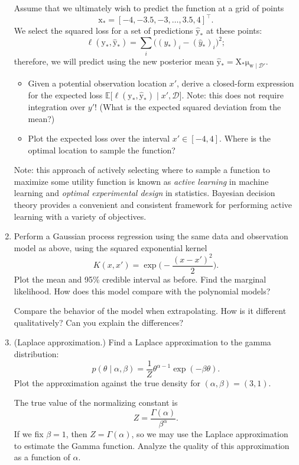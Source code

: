 \documentclass{article}
\newcommand{\given}{\mid}
\newcommand{\mc}[1]{\mathcal{#1}}
\newcommand{\data}{\mc{D}}
\newcommand{\mat}[1]{\bm{\mathrm{#1}}}
\renewcommand{\vec}[1]{\bm{\mathrm{#1}}}
\newcommand{\trans}{^\top}
\begin{document}
\begin{enumerate}
  Assume that we ultimately wish to predict the function at a grid of
  points
  \begin{equation*}
    \vec{x}_\ast = [-4, -3.5, -3, \dotsc, 3.5, 4]\trans.
  \end{equation*}
  We select the squared loss for a set of predictions
  $\hat{\vec{y}}_\ast$ at these points:
  \begin{equation*}
    \ell(\vec{y}_\ast, \hat{\vec{y}}_\ast)
    =
    \sum_i \bigl((y_\ast)_i - (\hat{y}_\ast)_i\bigr)^2;
  \end{equation*}
  therefore, we will predict using the new posterior mean
  $\hat{\vec{y}}_\ast = \mat{X}_\ast \vec{\mu}_{\vec{w}\given\data'}$.
  \begin{itemize}
  \item
    Given a potential observation location $x'$, derive a closed-form
    expression for the expected loss
    $\mathbb{E}\bigl[\ell(\vec{y}_\ast, \hat{\vec{y}}_\ast) \given x',
      \data \bigr]$.  Note: this does not require integration over
    $y'$!  (What is the expected squared deviation from the mean?)
  \item
    Plot the expected loss over the interval $x' \in [-4, 4]$.  Where
    is the optimal location to sample the function?
  \end{itemize}

  Note: this approach of actively selecting where to sample a function
  to maximize some utility function is known as \emph{active learning}
  in machine learning and \emph{optimal experimental design} in
  statistics.  Bayesian decision theory provides a convenient and
  consistent framework for performing active learning with a variety
  of objectives.

\item
  Perform a Gaussian process regression using the same data and
  observation model as above, using the squared exponential kernel
  \[K(x, x') = \exp\biggl(-\frac{(x - x')^2}{2}\biggr).\]
  Plot the mean and 95\% credible interval as before.  Find the
  marginal likelihood. How does this model compare with the polynomial
  models?

  Compare the behavior of the model when extrapolating. How is it
  different qualitatively? Can you explain the differences?

\item
  (Laplace approximation.)
  Find a Laplace approximation to the gamma distribution:
  \begin{equation*}
    p(\theta \given \alpha, \beta)
    =
    \frac{1}{Z}
    \theta^{\alpha - 1}
    \exp(-\beta\theta).
  \end{equation*}
  Plot the approximation against the true density for $(\alpha, \beta)
  = (3, 1)$.

  The true value of the normalizing constant is
  \begin{equation*}
    Z = \frac{\Gamma(\alpha)}{\beta^\alpha}.
  \end{equation*}
  If we fix $\beta = 1$, then $Z = \Gamma(\alpha)$, so we may use the
  Laplace approximation to estimate the Gamma function.  Analyze the
  quality of this approximation as a function of $\alpha$.

\end{enumerate}
\end{document}
